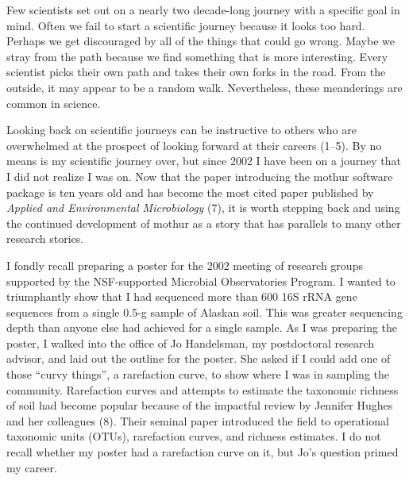 \documentclass[11pt,]{article}
\begin{document}
\newpage

Few scientists set out on a nearly two decade-long journey with a
specific goal in mind. Often we fail to start a scientific journey
because it looks too hard. Perhaps we get discouraged by all of the
things that could go wrong. Maybe we stray from the path because we find
something that is more interesting. Every scientist picks their own path
and takes their own forks in the road. From the outside, it may appear
to be a random walk. Nevertheless, these meanderings are common in
science.

Looking back on scientific journeys can be instructive to others who are
overwhelmed at the prospect of looking forward at their careers (1--5).
By no means is my scientific journey over, but since 2002 I have been on
a journey that I did not realize I was on. Now that the paper
introducing the mothur software package is ten years old and has become
the most cited paper published by \emph{Applied and Environmental
Microbiology} (7), it is worth stepping back and using the continued
development of mothur as a story that has parallels to many other
research stories.

I fondly recall preparing a poster for the 2002 meeting of research
groups supported by the NSF-supported Microbial Observatories Program. I
wanted to triumphantly show that I had sequenced more than 600 16S rRNA
gene sequences from a single 0.5-g sample of Alaskan soil. This was
greater sequencing depth than anyone else had achieved for a single
sample. As I was preparing the poster, I walked into the office of Jo
Handelsman, my postdoctoral research advisor, and laid out the outline
for the poster. She asked if I could add one of those ``curvy things'',
a rarefaction curve, to show where I was in sampling the community.
Rarefaction curves and attempts to estimate the taxonomic richness of
soil had become popular because of the impactful review by Jennifer
Hughes and her colleagues (8). Their seminal paper introduced the field
to operational taxonomic units (OTUs), rarefaction curves, and richness
estimates. I do not recall whether my poster had a rarefaction curve on
it, but Jo's question primed my career.
\end{document}
